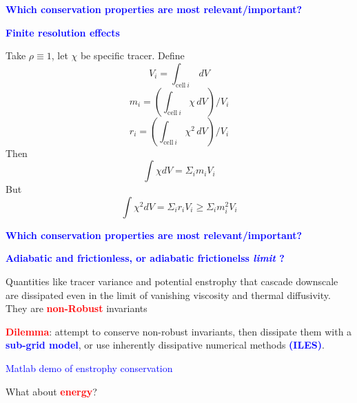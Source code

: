 \documentclass[a4]{seminar}
\newcommand{\R}[1]{\textcolor{red}{#1}}
\newcommand{\B}[1]{\textcolor{blue}{#1}}
\begin{document}
\begin{slide}

\B{\bf Which conservation properties are most relevant/important?}

\vspace{2mm}

\B{\bf Finite resolution effects}

Take \( \rho \equiv 1 \), let \( \chi \) be specific tracer.
Define
\begin{displaymath}
V_i = \int_{\mathrm{cell}\ i} \, dV
\end{displaymath}
\begin{displaymath}
m_i = \left( \int_{\mathrm{cell}\ i} \chi \, dV \right) / V_i
\end{displaymath}
\begin{displaymath}
r_i = \left( \int_{\mathrm{cell}\ i} \chi^2 \, dV \right) / V_i
\end{displaymath}
Then
\begin{displaymath}
\int \chi dV = \Sigma_i m_i V_i
\end{displaymath}
But
\begin{displaymath}
\int \chi^2 dV = \Sigma_i r_i V_i \geq \Sigma_i m_i^2 V_i
\end{displaymath}



\end{slide}


\begin{slide}

\B{\bf Which conservation properties are most relevant/important?}

\vspace{2mm}

\B{\bf Adiabatic and frictionless, or adiabatic frictionelss {\it limit} ?}

\vspace{3mm}

Quantities like tracer variance and potential enstrophy that cascade
downscale are dissipated even in the limit of vanishing viscosity and
thermal diffusivity. They are \R{\bf non-Robust} invariants

\vspace{2mm}

\R{\bf Dilemma}: attempt to conserve non-robust invariants, then dissipate
them with a \B{\bf sub-grid model}, or use inherently dissipative
numerical methods \B{\bf (ILES)}.

\vspace{2mm}

\begin{center}
\B{Matlab demo of enstrophy conservation}
\end{center}

\vspace{3mm}

What about \R{\bf energy}?


\end{slide}
\end{document}
